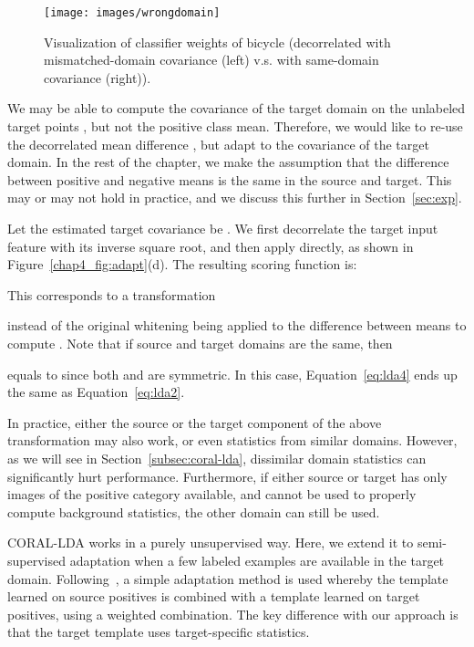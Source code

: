 \documentclass[graybox]{svmult}
\begin{document}
\begin{figure}
\centering
\texttt{[image: images/wrongdomain]}
\caption{\small Visualization of classifier weights of bicycle (decorrelated with mismatched-domain covariance (left) v.s. with same-domain covariance (right)).}
\label{chap4_fig:wrongdomain}
\end{figure}

We may be able to compute the covariance of the target domain on the unlabeled target points , but not the positive class mean. Therefore, we would like to re-use the decorrelated mean difference , but adapt to the covariance of the target domain.
In the rest of the chapter, we make the assumption that the difference between positive and negative means is the same in the source and target. This may or may not hold in practice, and we discuss this further in Section~\ref{sec:exp}.

Let the estimated target covariance be . We first decorrelate the target input feature with its inverse square root, and then apply  directly, as shown in Figure~\ref{chap4_fig:adapt}(d). The resulting scoring function is:

      
      
This corresponds to a transformation 

instead of the original whitening   being applied to the difference between means to compute . Note that if source and target domains are the same, then 
 
equals to  since both  and  are symmetric. In this case, Equation~\ref{eq:lda4} ends up the same as Equation~\ref{eq:lda2}.

In practice, either the source or the target component of the above transformation may also work, or even statistics from similar domains. However, as we will see in Section~\ref{subsec:coral-lda}, dissimilar domain statistics can significantly hurt performance. Furthermore, if either source or target has only images of the positive category available, and cannot be used to properly compute background statistics, the other domain can still be used.

CORAL-LDA works in a purely unsupervised way. Here, we extend it to semi-supervised adaptation when a few labeled examples are available in the target domain. Following~\cite{ICRA14}, a simple adaptation method is used whereby the template learned on source positives is combined with a template learned on target positives, using a weighted combination. The key difference with our approach is that the target template uses target-specific statistics.
\end{document}
